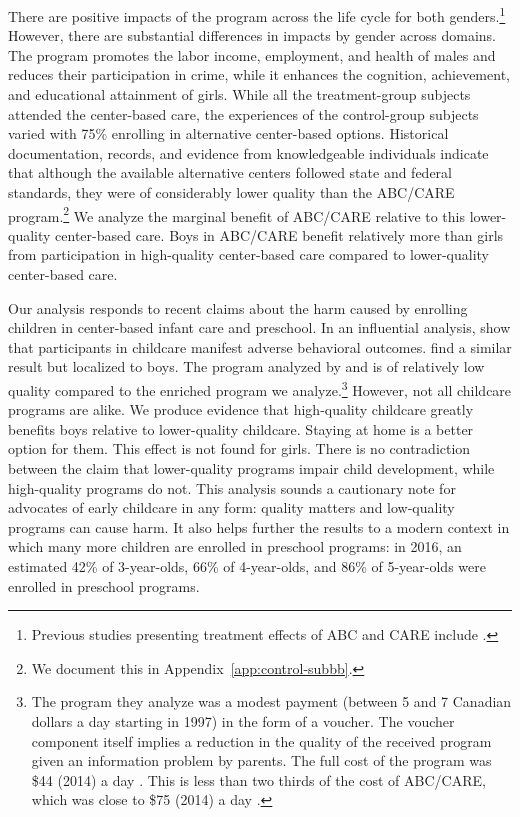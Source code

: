 There are positive impacts of the program across the life cycle for both genders.\footnote{Previous studies presenting treatment effects of ABC and CARE include \citet{Ramey_etal_1985_Project-CARE_TiECSE,Clarke_Campbell_1998_ABC_Comparison_ECRQ,Campbell_Pungello_etal_2001_DP,Campbell_Ramey_etal_2002_ADS,Campbell_Wasik_etal_2008_ECRQ,Campbell_Conti_etal_2014_EarlyChildhoodInvestments}.} However, there are substantial differences in impacts by gender across domains. The program promotes the labor income, employment, and health of males and reduces their participation in crime, while it enhances the cognition, achievement, and educational attainment of girls. While all the treatment-group subjects attended the center-based care, the experiences of the control-group subjects varied with 75\% enrolling in alternative center-based options. Historical documentation, records, and evidence from knowledgeable individuals indicate that although the available alternative centers followed state and federal standards, they were of considerably lower quality than the ABC/CARE program.\footnote{We document this in Appendix~\ref{app:control-subbb}.} We analyze the marginal benefit of ABC/CARE relative to this lower-quality center-based care. Boys in ABC/CARE benefit relatively more than girls from participation in high-quality center-based care compared to lower-quality center-based care.

Our analysis responds to recent claims about the harm caused by enrolling children in center-based infant care and preschool. In an influential analysis, \citet{Baker_Gruber_etal_2008_JPE} show that participants in childcare manifest adverse behavioral outcomes. \citet{Kottelenberg_Lehrer_2014_Gender-Effects} find a similar result but localized to boys.  The program analyzed by \citet{Baker_Gruber_Milligan_2015_Noncog_Defects} and \citet{Kottelenberg_Lehrer_2014_Gender-Effects} is of relatively low quality compared to the enriched program we analyze.\footnote{The program they analyze was a modest payment (between 5 and 7 Canadian dollars a day starting in 1997) in the form of a voucher. The voucher component itself implies a reduction in the quality of the received program given an information problem by parents. The full cost of the program was \$44 (2014) a day \citep{Baker_etal_2005_Universal_Childcare_NBER}. This is less than two thirds of the cost of ABC/CARE, which was close to \$75 (2014) a day \citep{Garcia_Heckman_Leaf_etal_2017_Comp_CBA_Unpublished}.} However, not all childcare programs are alike. We produce evidence that high-quality childcare greatly benefits boys relative to lower-quality childcare. Staying at home is a better option for them. This effect is not found for girls. There is no contradiction between the claim that lower-quality programs impair child development, while high-quality programs do not. This analysis sounds a cautionary note for advocates of early childcare in any form: quality matters and low-quality programs can cause harm. It also helps further the results to a modern context in which many more children are enrolled in preschool programs: in 2016, an estimated 42\% of 3-year-olds, 66\% of 4-year-olds, and 86\% of 5-year-olds were enrolled in preschool programs.

